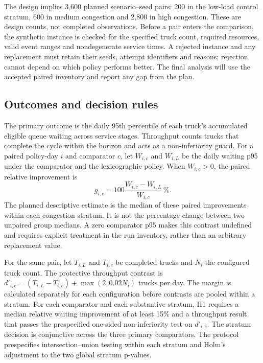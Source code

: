 \documentclass[12pt,a4paper]{article}
\begin{document}
The design implies 3,600 planned scenario–seed pairs: 200 in the low-load control stratum, 600 in medium congestion and 2,800 in high congestion. These are design counts, not completed observations. Before a pair enters the comparison, the synthetic instance is checked for the specified truck count, required resources, valid event ranges and nondegenerate service times. A rejected instance and any replacement must retain their seeds, attempt identifiers and reasons; rejection cannot depend on which policy performs better. The final analysis will use the accepted paired inventory and report any gap from the plan.

\subsection{Outcomes and decision rules}

The primary outcome is the daily 95th percentile of each truck's accumulated eligible queue waiting across service stages. Throughput counts trucks that complete the cycle within the horizon and acts as a non-inferiority guard. For a paired policy-day $i$ and comparator $c$, let $W_{i,c}$ and $W_{i,L}$ be the daily waiting p95 under the comparator and the lexicographic policy. When $W_{i,c}>0$, the paired relative improvement is
\begin{equation}
g_{i,c}=100\frac{W_{i,c}-W_{i,L}}{W_{i,c}}\,\%.
\label{eq:paired-gain}
\end{equation}
The planned descriptive estimate is the median of these paired improvements within each congestion stratum. It is not the percentage change between two unpaired group medians. A zero comparator p95 makes this contrast undefined and requires explicit treatment in the run inventory, rather than an arbitrary replacement value.

For the same pair, let $T_{i,L}$ and $T_{i,c}$ be completed trucks and $N_i$ the configured truck count. The protective throughput contrast is $d'_{i,c}=(T_{i,L}-T_{i,c})+\max(2,0.02N_i)$ trucks per day. The margin is calculated separately for each configuration before contrasts are pooled within a stratum. For each comparator and each substantive stratum, H1 requires a median relative waiting improvement of at least 15\% and a throughput result that passes the prespecified one-sided non-inferiority test on $d'_{i,c}$. The stratum decision is conjunctive across the three primary comparators. The protocol prespecifies intersection–union testing within each stratum and Holm's adjustment to the two global stratum p-values.
\end{document}
